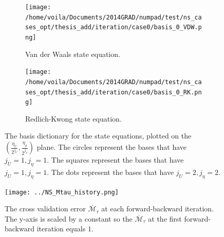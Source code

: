 \begin{figure}[htbp]\begin{center}
    \begin{subfigure}[t]{.49\textwidth}
        \centering
        \texttt{[image: /home/voila/Documents/2014GRAD/numpad/test/ns\_cases\_opt/thesis\_add/iteration/case0/basis\_0\_VDW.png]}
        \caption{Van der Waals state equation.}
        \label{fig: selected basis NS 1}
    \end{subfigure}
    \begin{subfigure}[t]{.49\textwidth}
        \centering
        \texttt{[image: /home/voila/Documents/2014GRAD/numpad/test/ns\_cases\_opt/thesis\_add/iteration/case0/basis\_0\_RK.png]}
        \caption{Redlich-Kwong state equation.}
        \label{fig: selected basis NS 2}
    \end{subfigure}
    \caption{The basis dictionary for the state equations, plotted on the $(\frac{\eta_U}{2^{j_U}},
             \frac{\eta_\rho}{2^{j_\rho}})$ plane. The circles represent the bases that have
             $j_U=1, j_\eta=1$. The squares represent the bases that have $j_U=1,j_\eta=1$.
             The dots represent the bases that have $j_U=2, j_\eta=2$.}
    \label{fig: selected basis NS}
\end{center}\end{figure}



\begin{figure}[htbp]
    \begin{center}
        \texttt{[image: ../NS\_Mtau\_history.png]}
        \caption{The cross validation error $\overline{\mathcal{M}}_{\tau}$ at 
                 each forward-backward iteration. The y-axis is scaled by a constant
                 so the $\overline{\mathcal{M}}_\tau$ at the first forward-backward
                 iteration equals $1$.}
        \label{fig: NS Mtau history}
    \end{center}
\end{figure}

